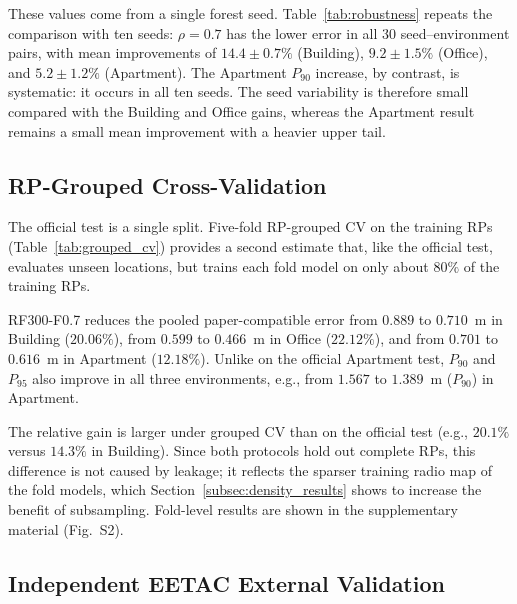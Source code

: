 These values come from a single forest seed. Table~\ref{tab:robustness} repeats the comparison with ten seeds: $\rho=0.7$ has the lower error in all 30 seed--environment pairs, with mean improvements of $14.4\pm0.7\%$ (Building), $9.2\pm1.5\%$ (Office), and $5.2\pm1.2\%$ (Apartment). The Apartment $P_{90}$ increase, by contrast, is systematic: it occurs in all ten seeds. The seed variability is therefore small compared with the Building and Office gains, whereas the Apartment result remains a small mean improvement with a heavier upper tail.



\subsection{RP-Grouped Cross-Validation}
\label{subsec:grouped_cv_results}

The official test is a single split. Five-fold RP-grouped CV on the training RPs (Table~\ref{tab:grouped_cv}) provides a second estimate that, like the official test, evaluates unseen locations, but trains each fold model on only about $80\%$ of the training RPs.



RF300-F0.7 reduces the pooled paper-compatible error from $0.889$ to $0.710$~m in Building ($20.06\%$), from $0.599$ to $0.466$~m in Office ($22.12\%$), and from $0.701$ to $0.616$~m in Apartment ($12.18\%$). Unlike on the official Apartment test, $P_{90}$ and $P_{95}$ also improve in all three environments, e.g., from $1.567$ to $1.389$~m ($P_{90}$) in Apartment.

The relative gain is larger under grouped CV than on the official test (e.g., $20.1\%$ versus $14.3\%$ in Building). Since both protocols hold out complete RPs, this difference is not caused by leakage; it reflects the sparser training radio map of the fold models, which Section~\ref{subsec:density_results} shows to increase the benefit of subsampling. Fold-level results are shown in the supplementary material (Fig.~S2).

\subsection{Independent EETAC External Validation}
\label{subsec:eetac_results}

